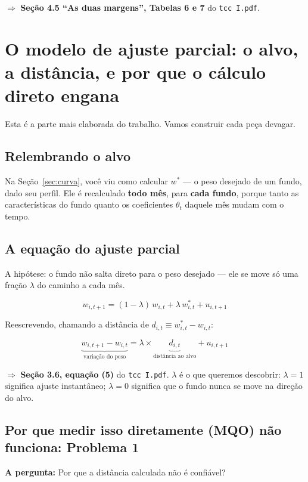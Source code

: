 \documentclass[11pt,a4paper]{article}
\newcommand{\pergunta}[1]{\par\vspace{4pt}\noindent\textbf{\color{azul}A pergunta:} #1\par\vspace{2pt}}
\begin{document}
$\Rightarrow$ \textbf{Seção 4.5 ``As duas margens'', Tabelas 6 e 7} do \texttt{tcc I.pdf}.

\section{O modelo de ajuste parcial: o alvo, a distância, e por que o cálculo direto engana}
\label{sec:pa}

Esta é a parte mais elaborada do trabalho. Vamos construir cada peça devagar.

\subsection{Relembrando o alvo}

Na Seção~\ref{sec:curva}, você viu como calcular $w^*$ --- o peso desejado de um fundo, dado seu
perfil. Ele é recalculado \textbf{todo mês}, para \textbf{cada fundo}, porque tanto as
características do fundo quanto os coeficientes $\theta_t$ daquele mês mudam com o tempo.

\subsection{A equação do ajuste parcial}

A hipótese: o fundo não salta direto para o peso desejado --- ele se move só uma fração
$\lambda$ do caminho a cada mês.

$$w_{i,t+1} = (1-\lambda)\,w_{i,t} + \lambda\,w^*_{i,t} + u_{i,t+1}$$

Reescrevendo, chamando a distância de $d_{i,t} \equiv w^*_{i,t} - w_{i,t}$:

$$\underbrace{w_{i,t+1}-w_{i,t}}_{\text{variação do peso}} = \lambda \times \underbrace{d_{i,t}}_{\text{distância ao alvo}} + u_{i,t+1}$$

$\Rightarrow$ \textbf{Seção 3.6, equação (5)} do \texttt{tcc I.pdf}. $\lambda$ é o que queremos descobrir:
$\lambda=1$ significa ajuste instantâneo; $\lambda=0$ significa que o fundo nunca se move na
direção do alvo.

\subsection{Por que medir isso diretamente (MQO) não funciona: Problema 1}
\label{sec:problema1}

\pergunta{Por que a distância calculada não é confiável?}
\end{document}

